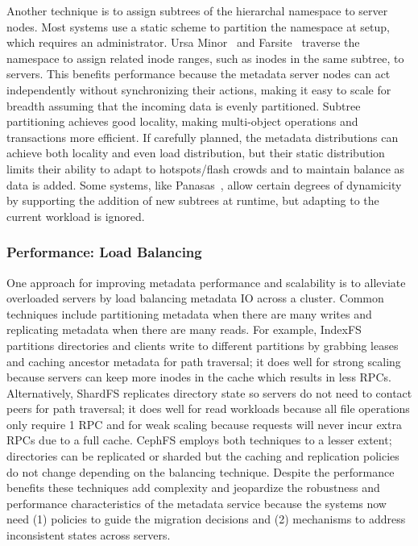 Another technique is to assign subtrees of the hierarchal namespace to server
nodes. Most systems use a static scheme to partition the namespace at setup,
which requires an administrator. Ursa Minor~\cite{sinnamohideen:atc2010-ursa}
and Farsite~\cite{doucer:osdi2006-farsite-dir} traverse the namespace to assign
related inode ranges, such as inodes in the same subtree, to servers. This
benefits performance because the metadata server nodes can act independently
without synchronizing their actions, making it easy to scale for breadth
assuming that the incoming data is evenly partitioned.  Subtree partitioning
achieves good locality, making multi-object operations and transactions more
efficient. If carefully planned, the metadata distributions can achieve both
locality and even load distribution, but their static distribution limits their
ability to adapt to hotspots/flash crowds and to maintain balance as data is
added.  Some systems, like Panasas~\cite{welch:fast2008-panasas}, allow certain
degrees of dynamicity by supporting the addition of new subtrees at runtime,
but adapting to the current workload is ignored. 


\subsubsection{Performance: Load Balancing}

One approach for improving metadata performance and scalability is to alleviate
overloaded servers by load balancing metadata IO across a cluster. Common
techniques include partitioning metadata when there are many writes and
replicating metadata when there are many reads. For example,
IndexFS~\cite{ren:sc2014-indexfs} partitions directories and clients write to
different partitions by grabbing leases and caching ancestor metadata for path
traversal; it does well for strong scaling because servers can keep more inodes
in the cache which results in less RPCs.  Alternatively, ShardFS replicates
directory state so servers do not need to contact peers for path traversal; it
does well for read workloads because all file operations only require 1 RPC and
for weak scaling because requests will never incur extra RPCs due to a full
cache.  CephFS employs both techniques to a lesser extent; directories can be
replicated or sharded but the caching and replication policies do not change
depending on the balancing technique.  Despite the performance benefits these
techniques add complexity and jeopardize the robustness and performance
characteristics of the metadata service because the systems now need (1)
policies to guide the migration decisions and (2) mechanisms to address
inconsistent states across servers.

